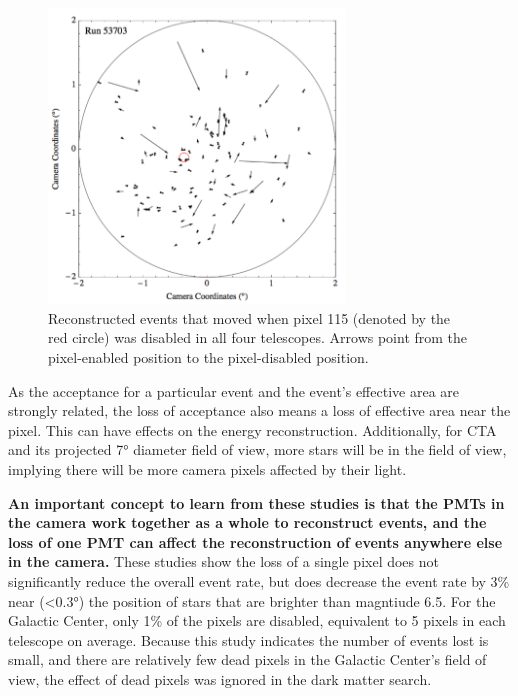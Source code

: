 \begin{figure}[!ht]
  \centering
  \includegraphics[width=0.7\textwidth]{images/disabled_pixel/moving_events}
  \caption[Event Movement After Disabling Camera Pixels]{
    Reconstructed events that moved when pixel 115 (denoted by the red circle) was disabled in all four telescopes.  
    Arrows point from the pixel-enabled position to the pixel-disabled position.
  }
  \label{fig:dpix_move}
\end{figure}

As the acceptance for a particular event and the event's effective area are strongly related, the loss of acceptance also means a loss of effective area near the pixel.
This can have effects on the energy reconstruction.
Additionally, for CTA and its projected \ang{7} diameter field of view, more stars will be in the field of view, implying there will be more camera pixels affected by their light.

\textbf{An important concept to learn from these studies is that the PMTs in the camera work together as a whole to reconstruct events, and the loss of one PMT can affect the reconstruction of events anywhere else in the camera.}
These studies show the loss of a single pixel does not significantly reduce the overall event rate, but does decrease the event rate by \nicetilde{}3\% near (<\ang{0.3}) the position of stars that are brighter than magntiude 6.5.
For the Galactic Center, only 1\% of the pixels are disabled, equivalent to 5 pixels in each telescope on average.
Because this study indicates the number of events lost is small, and there are relatively few dead pixels in the Galactic Center's field of view, the effect of dead pixels was ignored in the dark matter search.

